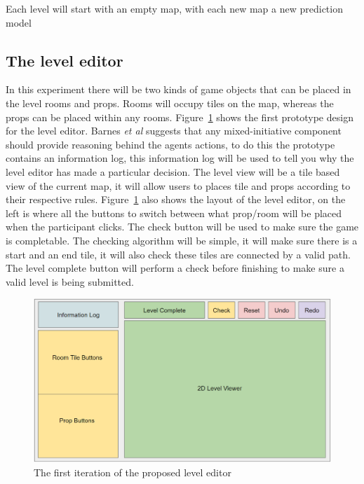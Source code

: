 \documentclass[journal]{IEEEtran}
\begin{document}
Each level will start with an empty map, with each new map a new prediction model

\begin{table}[h]
	\centering
	\caption{Editor Settings}
	\label{settings}
	\def\arraystretch{2}
\end{table}

\subsection{The level editor}
In this experiment there will be two kinds of game objects that can be placed in the level rooms and props. Rooms will occupy tiles on the map, whereas the props can be placed within any rooms. Figure~\ref{myLevelEditor} shows the first prototype design for the level editor. Barnes \textit{et al}\cite{barnes2015designing} suggests that any mixed-initiative component should provide reasoning behind the agents actions, to do this the prototype contains an information log, this information log will be used to tell you why the level editor has made a particular decision. The level view will be a tile based view of the current map, it will allow users to places tile and props according to their respective rules. Figure~\ref{myLevelEditor} also shows the layout of the level editor, on the left is where all the buttons to switch between what prop/room will be placed when the participant clicks. The check button will be used to make sure the game is completable. The checking algorithm will be simple, it will make sure there is a start and an end tile, it will also check these tiles are connected by a valid path. The level complete button will perform a check before finishing to make sure a valid level is being submitted.

\begin{figure}[h]
	\includegraphics[width=1.0\linewidth]{LevelEditorLayout.PNG}
	\caption{The first iteration of the proposed level editor}
	\label{myLevelEditor}
\end{figure} 






\end{document}
